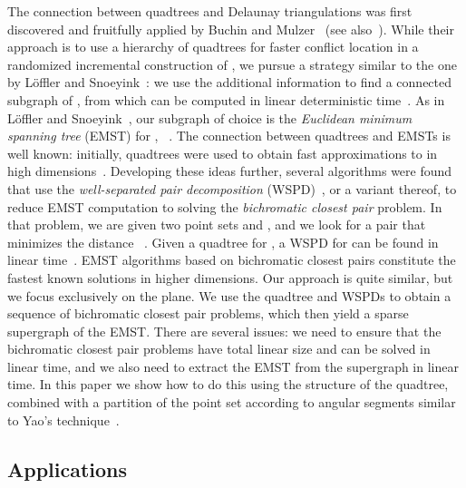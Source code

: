 \documentclass[11pt]{paper}
\begin{document}
  The connection between quadtrees and Delaunay triangulations was first
  discovered and fruitfully applied by Buchin and
  Mulzer~\cite{BuchinMu11} (see also~\cite{BuchinLoMoMuXX}).
  While their approach is to use a hierarchy of quadtrees
  for faster conflict location in a randomized incremental
  construction of ,
  we pursue a strategy similar to the one by
  L{\"o}ffler and Snoeyink~\cite{LoefflerSn10}:
  we use the additional information
  to find a connected subgraph of ,
  from which  can be computed in linear deterministic 
  time~\cite{ChinWa99}.
  As in L{\"o}ffler and Snoeyink~\cite{LoefflerSn10},
  our subgraph of choice is the
  \emph{Euclidean minimum spanning tree} (EMST) for ,
  ~\cite{Eppstein00}.
  The connection between quadtrees and EMSTs is well known:
  initially, quadtrees were used to obtain fast approximations
  to  in high dimensions~\cite{CallahanKo93,Vaidya88}.
  Developing these ideas further, several algorithms  were found that
  use the \emph{well-separated pair decomposition}
  (WSPD)~\cite{CallahanKo95},
  or a variant thereof, to reduce EMST computation to
  solving the \emph{bichromatic closest pair} problem. In that
  problem, we are given
  two point sets  and , and we look for a
  pair  that minimizes the distance
  ~\cite{AgarwalEdScWe91,CallahanKo93,KrznaricLeNi99,Yao82}.
  Given a quadtree for , a WSPD for  can be found in
  linear time~\cite{BuchinLoMoMuXX,CallahanKo95,Chan08,HarPeled11}. 
  EMST algorithms based
  on bichromatic closest pairs constitute the fastest
  known solutions in higher dimensions. 
  Our approach is quite similar, but we focus exclusively
  on the plane. We use the quadtree and WSPDs to
  obtain a sequence of bichromatic closest pair problems,
  which then yield a sparse supergraph of the EMST. 
  There are several issues:  we need
  to ensure that the bichromatic closest pair problems
  have total linear size and can be solved in linear time,
  and we also need to extract the EMST from the supergraph
  in linear time.
  In this paper we show how to do this using
  the structure of the quadtree, combined with a partition of the
  point set according to angular segments similar to 
  Yao's technique~\cite{Yao82}.

  \subsection {Applications}
\end{document}
